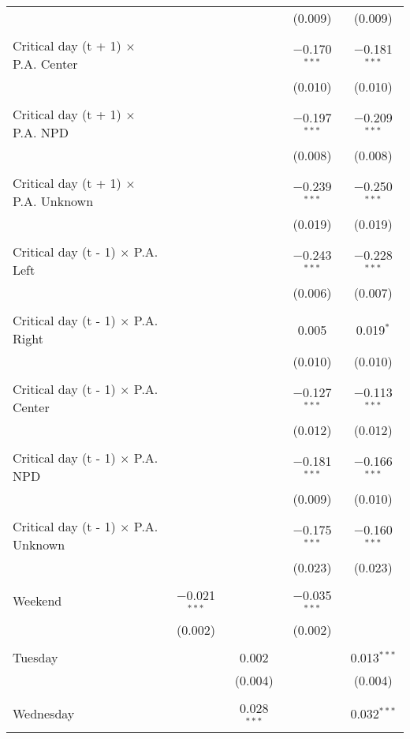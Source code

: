 \documentclass[
]{article}
\begin{document}
\begin{table}[!htbp]
{\begin{tabular}{@{\extracolsep{5pt}}lcccc}
  &  &  & (0.009) & (0.009) \\ 
  & & & & \\ 
 Critical day (t + 1) $\times$ P.A. Center &  &  & $-$0.170$^{***}$ & $-$0.181$^{***}$ \\ 
  &  &  & (0.010) & (0.010) \\ 
  & & & & \\ 
 Critical day (t + 1) $\times$ P.A. NPD &  &  & $-$0.197$^{***}$ & $-$0.209$^{***}$ \\ 
  &  &  & (0.008) & (0.008) \\ 
  & & & & \\ 
 Critical day (t + 1) $\times$ P.A. Unknown &  &  & $-$0.239$^{***}$ & $-$0.250$^{***}$ \\ 
  &  &  & (0.019) & (0.019) \\ 
  & & & & \\ 
 Critical day (t - 1) $\times$ P.A. Left &  &  & $-$0.243$^{***}$ & $-$0.228$^{***}$ \\ 
  &  &  & (0.006) & (0.007) \\ 
  & & & & \\ 
 Critical day (t - 1) $\times$ P.A. Right &  &  & 0.005 & 0.019$^{*}$ \\ 
  &  &  & (0.010) & (0.010) \\ 
  & & & & \\ 
 Critical day (t - 1) $\times$ P.A. Center &  &  & $-$0.127$^{***}$ & $-$0.113$^{***}$ \\ 
  &  &  & (0.012) & (0.012) \\ 
  & & & & \\ 
 Critical day (t - 1) $\times$ P.A. NPD &  &  & $-$0.181$^{***}$ & $-$0.166$^{***}$ \\ 
  &  &  & (0.009) & (0.010) \\ 
  & & & & \\ 
 Critical day (t - 1) $\times$ P.A. Unknown &  &  & $-$0.175$^{***}$ & $-$0.160$^{***}$ \\ 
  &  &  & (0.023) & (0.023) \\ 
  & & & & \\ 
 Weekend & $-$0.021$^{***}$ &  & $-$0.035$^{***}$ &  \\ 
  & (0.002) &  & (0.002) &  \\ 
  & & & & \\ 
 Tuesday &  & 0.002 &  & 0.013$^{***}$ \\ 
  &  & (0.004) &  & (0.004) \\ 
  & & & & \\ 
 Wednesday &  & 0.028$^{***}$ &  & 0.032$^{***}$ \\ 

\end{tabular}}
\end{table}
\end{document}
